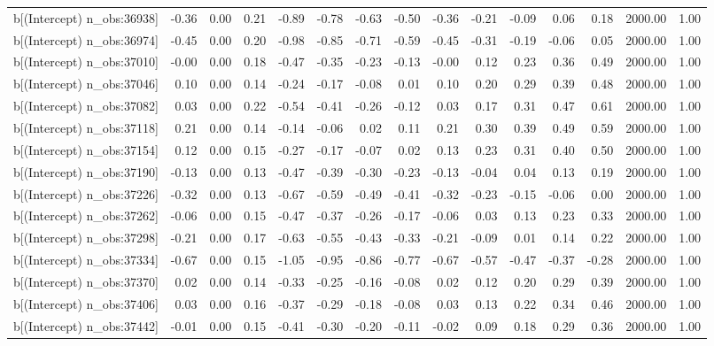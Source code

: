 \begin{table}[ht]
\begin{tabular}{rrrrrrrrrrrrrrr}
  b[(Intercept) n\_obs:36938] & -0.36 & 0.00 & 0.21 & -0.89 & -0.78 & -0.63 & -0.50 & -0.36 & -0.21 & -0.09 & 0.06 & 0.18 & 2000.00 & 1.00 \\ 
  b[(Intercept) n\_obs:36974] & -0.45 & 0.00 & 0.20 & -0.98 & -0.85 & -0.71 & -0.59 & -0.45 & -0.31 & -0.19 & -0.06 & 0.05 & 2000.00 & 1.00 \\ 
  b[(Intercept) n\_obs:37010] & -0.00 & 0.00 & 0.18 & -0.47 & -0.35 & -0.23 & -0.13 & -0.00 & 0.12 & 0.23 & 0.36 & 0.49 & 2000.00 & 1.00 \\ 
  b[(Intercept) n\_obs:37046] & 0.10 & 0.00 & 0.14 & -0.24 & -0.17 & -0.08 & 0.01 & 0.10 & 0.20 & 0.29 & 0.39 & 0.48 & 2000.00 & 1.00 \\ 
  b[(Intercept) n\_obs:37082] & 0.03 & 0.00 & 0.22 & -0.54 & -0.41 & -0.26 & -0.12 & 0.03 & 0.17 & 0.31 & 0.47 & 0.61 & 2000.00 & 1.00 \\ 
  b[(Intercept) n\_obs:37118] & 0.21 & 0.00 & 0.14 & -0.14 & -0.06 & 0.02 & 0.11 & 0.21 & 0.30 & 0.39 & 0.49 & 0.59 & 2000.00 & 1.00 \\ 
  b[(Intercept) n\_obs:37154] & 0.12 & 0.00 & 0.15 & -0.27 & -0.17 & -0.07 & 0.02 & 0.13 & 0.23 & 0.31 & 0.40 & 0.50 & 2000.00 & 1.00 \\ 
  b[(Intercept) n\_obs:37190] & -0.13 & 0.00 & 0.13 & -0.47 & -0.39 & -0.30 & -0.23 & -0.13 & -0.04 & 0.04 & 0.13 & 0.19 & 2000.00 & 1.00 \\ 
  b[(Intercept) n\_obs:37226] & -0.32 & 0.00 & 0.13 & -0.67 & -0.59 & -0.49 & -0.41 & -0.32 & -0.23 & -0.15 & -0.06 & 0.00 & 2000.00 & 1.00 \\ 
  b[(Intercept) n\_obs:37262] & -0.06 & 0.00 & 0.15 & -0.47 & -0.37 & -0.26 & -0.17 & -0.06 & 0.03 & 0.13 & 0.23 & 0.33 & 2000.00 & 1.00 \\ 
  b[(Intercept) n\_obs:37298] & -0.21 & 0.00 & 0.17 & -0.63 & -0.55 & -0.43 & -0.33 & -0.21 & -0.09 & 0.01 & 0.14 & 0.22 & 2000.00 & 1.00 \\ 
  b[(Intercept) n\_obs:37334] & -0.67 & 0.00 & 0.15 & -1.05 & -0.95 & -0.86 & -0.77 & -0.67 & -0.57 & -0.47 & -0.37 & -0.28 & 2000.00 & 1.00 \\ 
  b[(Intercept) n\_obs:37370] & 0.02 & 0.00 & 0.14 & -0.33 & -0.25 & -0.16 & -0.08 & 0.02 & 0.12 & 0.20 & 0.29 & 0.39 & 2000.00 & 1.00 \\ 
  b[(Intercept) n\_obs:37406] & 0.03 & 0.00 & 0.16 & -0.37 & -0.29 & -0.18 & -0.08 & 0.03 & 0.13 & 0.22 & 0.34 & 0.46 & 2000.00 & 1.00 \\ 
  b[(Intercept) n\_obs:37442] & -0.01 & 0.00 & 0.15 & -0.41 & -0.30 & -0.20 & -0.11 & -0.02 & 0.09 & 0.18 & 0.29 & 0.36 & 2000.00 & 1.00 \\ 

\end{tabular}
\end{table}
